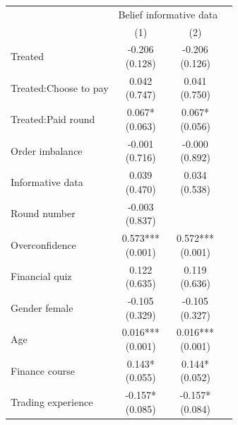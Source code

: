 \renewcommand\cellalign{t}
\begin{threeparttable}
\begin{tabular}{lccc}
\toprule
 & \multicolumn{2}{c}{Belief informative data} \\
\cmidrule(lr){2-3} 
 & (1) & (2) \\
\midrule
\addlinespace
Treated & \makecell{-0.206 \\ (0.128) } & \makecell{-0.206 \\ (0.126) } \\
Treated:Choose to pay & \makecell{0.042 \\ (0.747) } & \makecell{0.041 \\ (0.750) } \\
Treated:Paid round & \makecell{0.067* \\ (0.063) } & \makecell{0.067* \\ (0.056) } \\
Order imbalance & \makecell{-0.001 \\ (0.716) } & \makecell{-0.000 \\ (0.892) } \\
Informative data & \makecell{0.039 \\ (0.470) } & \makecell{0.034 \\ (0.538) } \\
Round number & \makecell{-0.003 \\ (0.837) } &  \\
Overconfidence & \makecell{0.573*** \\ (0.001) } & \makecell{0.572*** \\ (0.001) } \\
Financial quiz & \makecell{0.122 \\ (0.635) } & \makecell{0.119 \\ (0.636) } \\
Gender female & \makecell{-0.105 \\ (0.329) } & \makecell{-0.105 \\ (0.327) } \\
Age & \makecell{0.016*** \\ (0.001) } & \makecell{0.016*** \\ (0.001) } \\
Finance course & \makecell{0.143* \\ (0.055) } & \makecell{0.144* \\ (0.052) } \\
Trading experience & \makecell{-0.157* \\ (0.085) } & \makecell{-0.157* \\ (0.084) } \\

\end{tabular}
\end{threeparttable}
